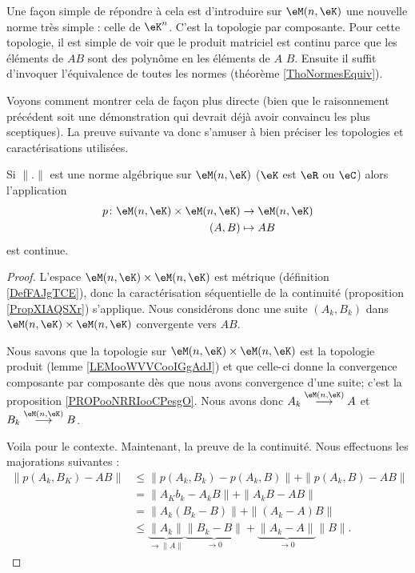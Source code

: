 Une façon simple de répondre à cela est d'introduire sur \( \eM(n,\eK)\) une nouvelle norme très simple : celle de \( \eK^n\). C'est la topologie par composante. Pour cette topologie, il est simple de voir que le produit matriciel est continu parce que les éléments de \( AB\) sont des polynôme en les éléments de \( A\) \( B\). Ensuite il suffit d'invoquer l'équivalence de toutes les normes (théorème \ref{ThoNormesEquiv}).

Voyons comment montrer cela de façon plus directe (bien que le raisonnement précédent soit une démonstration qui devrait déjà avoir convaincu les plus sceptiques). La preuve suivante va donc s'amuser à bien préciser les topologies et caractérisations utilisées.

\begin{lemma}
    Si \( \| . \|\) est une norme algébrique sur \( \eM(n,\eK)\) (\( \eK\) est \( \eR\) ou \( \eC\)) alors l'application
    \begin{equation}
        \begin{aligned}
            p\colon \eM(n,\eK)\times \eM(n,\eK)&\to \eM(n,\eK) \\
            (A,B)&\mapsto AB 
        \end{aligned}
    \end{equation}
    est continue.
\end{lemma}

\begin{proof}
    L'espace \( \eM(n,\eK)\times \eM(n,\eK)\) est métrique (définition \ref{DefFAJgTCE}), donc la caractérisation séquentielle de la continuité (proposition \ref{PropXIAQSXr}) s'applique. Nous considérons donc une suite \( (A_k,B_k)\) dans \( \eM(n,\eK)\times \eM(n,\eK)\) convergente vers \( AB\).

    Nous savons que la topologie sur \( \eM(n,\eK)\times \eM(n,\eK)\) est la topologie produit (lemme \ref{LEMooWVVCooIGgAdJ}) et que celle-ci donne la convergence composante par composante dès que nous avons convergence d'une suite; c'est la proposition \ref{PROPooNRRIooCPesgO}. Nous avons donc \( A_k\stackrel{\eM(n,\eK)}{\longrightarrow}A\) et \( B_k\stackrel{\eM(n,\eK)}{\longrightarrow}B\).

    Voila pour le contexte. Maintenant, la preuve de la continuité. Nous effectuons les majorations suivantes :
    \begin{subequations}
        \begin{align}
            \| p(A_k,B_K)-AB \|&\leq \| p(A_k,B_k)-p(A_k,B) \|+\| p(A_k,B)-AB \|\\
            &=\| A_Kb_k-A_kB \|+\| A_kB-AB \|\\
            &=\| A_k(B_k-B) \|+\| (A_k-A)B \|\\
            &\leq \underbrace{\| A_k \|}_{\to \| A \|}\underbrace{\| B_k-B \|}_{\to 0}+\underbrace{\| A_k-A \|}_{\to 0}\| B \|.
        \end{align}
    \end{subequations}
\end{proof}

